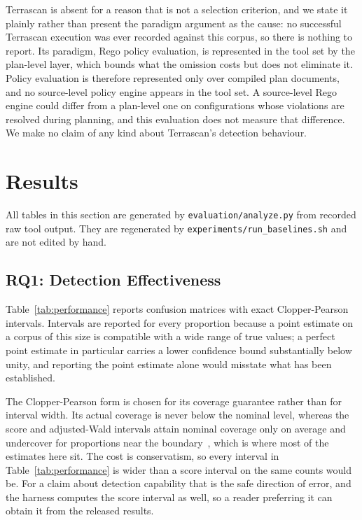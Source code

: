 \documentclass[journal]{IEEEtran}
\newcommand{\resulttable}[1]{%
  \IfFileExists{../results/tables/#1.tex}%
    {}%
    {\begin{table}[!t]\centering\small
       \fbox{\parbox{0.9\columnwidth}{\centering
         \texttt{\detokenize{results/tables/#1.tex}} not found.\\[2pt]
         Run \texttt{experiments/run\_baselines.sh} to generate it.}}%
     \end{table}}}
\renewcommand{\resulttable}[1]{}
\begin{document}
Terrascan is absent for a reason that is not a selection criterion, and we state
it plainly rather than present the paradigm argument as the cause: no successful
Terrascan execution was ever recorded against this corpus, so there is nothing to
report. Its paradigm, Rego policy evaluation, is represented in the tool set by the
plan-level layer, which bounds what the omission costs but does not eliminate it.
Policy evaluation is therefore represented only over compiled plan documents, and
no source-level policy engine appears in the tool set. A source-level Rego engine
could differ from a plan-level one on configurations whose violations are resolved
during planning, and this evaluation does not measure that difference. We make no
claim of any kind about Terrascan's detection behaviour.

\section{Results}
\label{sec:results}

All tables in this section are generated by \texttt{evaluation/analyze.py} from
recorded raw tool output. They are regenerated by
\texttt{experiments/run\_baselines.sh} and are not edited by hand.

\subsection{RQ1: Detection Effectiveness}
\resulttable{performance}

Table~\ref{tab:performance} reports confusion matrices with exact
Clopper-Pearson intervals. Intervals are reported for every proportion because a
point estimate on a corpus of this size is compatible with a wide range of true
values; a perfect point estimate in particular carries a lower confidence bound
substantially below unity, and reporting the point estimate alone would misstate
what has been established.

The Clopper-Pearson form is chosen for its coverage guarantee rather than for
interval width. Its actual coverage is never below the nominal level, whereas the
score and adjusted-Wald intervals attain nominal coverage only on average and
undercover for proportions near the boundary~\cite{agresti1998approximate}, which
is where most of the estimates here sit. The cost is conservatism, so every
interval in Table~\ref{tab:performance} is wider than a score interval on the same
counts would be. For a claim about detection capability that is the safe direction
of error, and the harness computes the score interval as well, so a reader
preferring it can obtain it from the released results.
\end{document}
